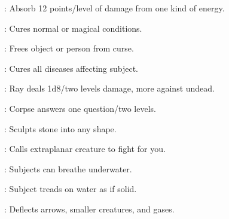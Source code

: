 \begin{multicols}{2}
\begin{description*}
\item[\linkspell{Protection from Energy}:] Absorb 12 points/level of damage from one kind of energy.
\item[\linkspell{Remove Blindness/Deafness}:] Cures normal or magical conditions.
\item[\linkspell{Remove Curse}:] Frees object or person from curse.
\item[\linkspell{Remove Disease}:] Cures all diseases affecting subject.
\item[\linkspell{Searing Light}:] Ray deals 1d8/two levels damage, more against undead.
\item[\linkspell{Speak with Dead}:] Corpse answers one question/two levels.
\item[\linkspell{Stone Shape}:] Sculpts stone into any shape.
\item[\linkspell{Summon Monster III}:] Calls extraplanar creature to fight for you.
\item[\linkspell{Water Breathing}:] Subjects can breathe underwater.
\item[\linkspell{Water Walk}:] Subject treads on water as if solid.
\item[\linkspell{Wind Wall}:] Deflects arrows, smaller creatures, and gases.
\end{description*}


\end{multicols}
